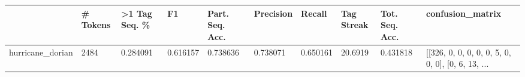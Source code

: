 \begin{tabular}{llllllllll}
\toprule
{} & \# Tokens & >1 Tag Seq. \% &        F1 & Part. Seq. Acc. & Precision &    Recall & Tag Streak & Tot. Seq. Acc. &                                   confusion\_matrix \\
\midrule
hurricane\_dorian &     2484 &      0.284091 &  0.616157 &        0.738636 &  0.738071 &  0.650161 &    20.6919 &       0.431818 &  [[326, 0, 0, 0, 0, 0, 5, 0, 0, 0], [0, 6, 13, ... \\
\bottomrule
\end{tabular}
